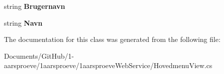 \begin{DoxyCompactItemize}
\item 
\hypertarget{class__1aarsproeve_web_service_1_1_hovedmenu_view_a40a77cefaa6839049e39dacf9236180a}{}string {\bfseries Brugernavn}\label{class__1aarsproeve_web_service_1_1_hovedmenu_view_a40a77cefaa6839049e39dacf9236180a}

\item 
\hypertarget{class__1aarsproeve_web_service_1_1_hovedmenu_view_a27adb97b331f302f6ad6b5b56ec9738b}{}string {\bfseries Navn}\label{class__1aarsproeve_web_service_1_1_hovedmenu_view_a27adb97b331f302f6ad6b5b56ec9738b}

\end{DoxyCompactItemize}


The documentation for this class was generated from the following file\+:\begin{DoxyCompactItemize}
\item 
Documents/\+Git\+Hub/1-\/aarsproeve/1aarsproeve/1aarsproeve\+Web\+Service/Hovedmenu\+View.\+cs\end{DoxyCompactItemize}
